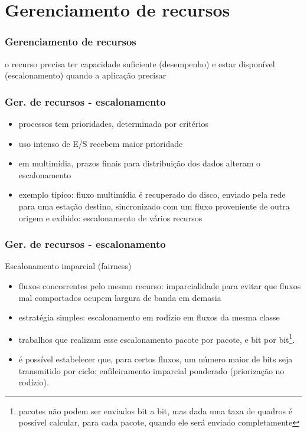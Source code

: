 \documentclass[]{beamer}
\begin{document}
\section{Gerenciamento de recursos}

\begin{frame}
  \frametitle{Gerenciamento de recursos}
  o recurso precisa ter capacidade suficiente (desempenho) e estar disponível
(escalonamento) quando a aplicação precisar
\end{frame}

\begin{frame}
  \frametitle{Ger. de recursos - escalonamento}
\begin{itemize}
  \item processos tem prioridades, determinada por critérios
  \item uso intenso de E/S recebem maior prioridade
  \item em multimídia, prazos finais para distribuição dos dados alteram o escalonamento
  \item exemplo típico: fluxo multimídia é recuperado do disco, enviado pela rede para
uma estação destino, sincronizado com um fluxo proveniente de outra origem e 
exibido: escalonamento de vários recursos
\end{itemize}
\end{frame}

\begin{frame}
  \frametitle{Ger. de recursos - escalonamento}
Escalonamento imparcial (fairness)
\begin{itemize}
  \item fluxos concorrentes pelo mesmo recurso: imparcialidade para evitar que
fluxos mal comportados ocupem largura de banda em demasia
  \item estratégia simples: escalonamento em rodízio em fluxos da mesma classe
  \item trabalhos que realizam esse escalonamento pacote por pacote, e bit por 
bit\footnote{pacotes não podem ser enviados bit a bit, mas dada uma taxa de quadros é possível
calcular, para cada pacote, quando ele será enviado completamente}.
  \item é possível estabelecer que, para certos fluxos, um número maior de bits seja transmitido
por ciclo: enfileiramento imparcial ponderado (priorização no rodízio).
\end{itemize}
\end{frame}
\end{document}
